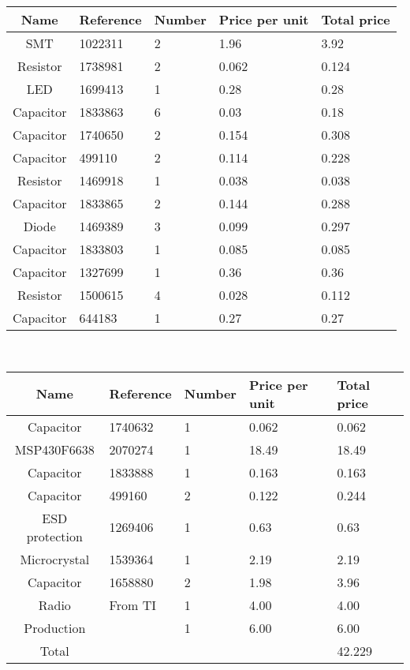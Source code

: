 \begin{tabular}{| c |l | l | l | l |} 
	\hline
		Name & Reference & Number & Price per unit & Total price\\ \hline
		SMT & 1022311 & 2 & 1.96 & 3.92\\ \hline
		Resistor & 1738981 & 2 & 0.062 & 0.124\\ \hline
		LED & 1699413 & 1 & 0.28 & 0.28\\ \hline
		Capacitor & 1833863 & 6 & 0.03 & 0.18\\ \hline
		Capacitor & 1740650 & 2 & 0.154 & 0.308\\ \hline
		Capacitor & 499110 & 2 & 0.114 & 0.228\\ \hline
		Resistor & 1469918 & 1 & 0.038 & 0.038\\ \hline
		Capacitor & 1833865 & 2 & 0.144 & 0.288\\ \hline
		Diode & 1469389 & 3 & 0.099 & 0.297\\ \hline
	   	Capacitor & 1833803 & 1 & 0.085 & 0.085\\ \hline
 		Capacitor & 1327699 & 1 & 0.36 & 0.36 \\ \hline
  		Resistor & 1500615 & 4 & 0.028 & 0.112\\ \hline
	 	Capacitor & 644183 & 1 & 0.27 & 0.27 \\ \hline
\end{tabular}\\
\begin{tabular}{| c |l | l | l | l |} 
		\hline
		Name & Reference & Number & Price per unit & Total price\\ \hline
	 	Capacitor & 1740632 & 1 & 0.062 & 0.062\\ \hline
	 	MSP430F6638 & 2070274 & 1 & 18.49 & 18.49\\ \hline
	 	Capacitor & 1833888 & 1 & 0.163 & 0.163\\ \hline
	 	Capacitor & 499160 & 2 & 0.122 & 0.244\\ \hline
	 	ESD protection & 1269406 & 1 & 0.63 & 0.63\\ \hline
	 	Microcrystal & 1539364 & 1 & 2.19 & 2.19\\ \hline
	 	Capacitor & 1658880 & 2 & 1.98 & 3.96\\ \hline
	 	Radio & From TI & 1 & 4.00 & 4.00\\ \hline
		Production & & 1 & 6.00 & 6.00\\ \hline
	 	Total &  &  &  & 42.229\\ \hline
\end{tabular}\\

